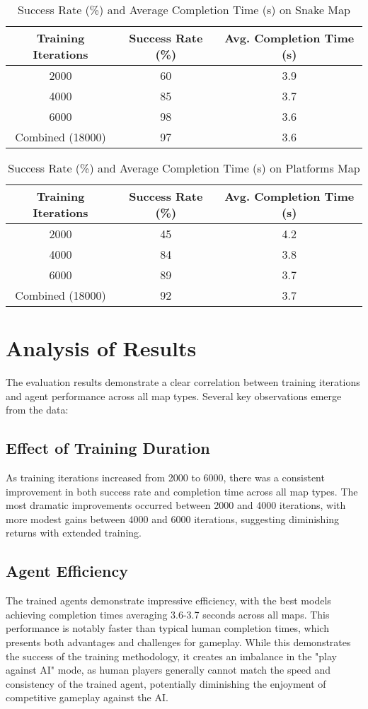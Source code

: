 \begin{table}[H]
\centering
\caption{Success Rate (\%) and Average Completion Time (s) on Snake Map}
\begin{tabular}{|c|c|c|}
\hline
\textbf{Training Iterations} & \textbf{Success Rate (\%)} & \textbf{Avg. Completion Time (s)} \\
\hline
2000 & 60 & 3.9 \\
\hline
4000 & 85 & 3.7 \\
\hline
6000 & 98 & 3.6 \\
\hline
Combined (18000) & 97 & 3.6 \\
\hline
\end{tabular}
\end{table}

\begin{table}[H]
\centering
\caption{Success Rate (\%) and Average Completion Time (s) on Platforms Map}
\begin{tabular}{|c|c|c|}
\hline
\textbf{Training Iterations} & \textbf{Success Rate (\%)} & \textbf{Avg. Completion Time (s)} \\
\hline
2000 & 45 & 4.2 \\
\hline
4000 & 84 & 3.8 \\
\hline
6000 & 89 & 3.7 \\
\hline
Combined (18000) & 92 & 3.7 \\
\hline
\end{tabular}
\end{table}

\section{Analysis of Results}

The evaluation results demonstrate a clear correlation between training iterations and agent performance across all map types. Several key observations emerge from the data:

\subsection{Effect of Training Duration}
As training iterations increased from 2000 to 6000, there was a consistent improvement in both success rate and completion time across all map types. 
The most dramatic improvements occurred between 2000 and 4000 iterations, with more modest gains between 4000 and 6000 iterations, suggesting diminishing returns with extended training.

\subsection{Agent Efficiency}
The trained agents demonstrate impressive efficiency, with the best models achieving completion times averaging 3.6-3.7 seconds across all maps. 
This performance is notably faster than typical human completion times, which presents both advantages and challenges for gameplay. 
While this demonstrates the success of the training methodology, it creates an imbalance in the "play against AI" mode, 
as human players generally cannot match the speed and consistency of the trained agent, potentially diminishing the enjoyment of competitive gameplay against the AI.

